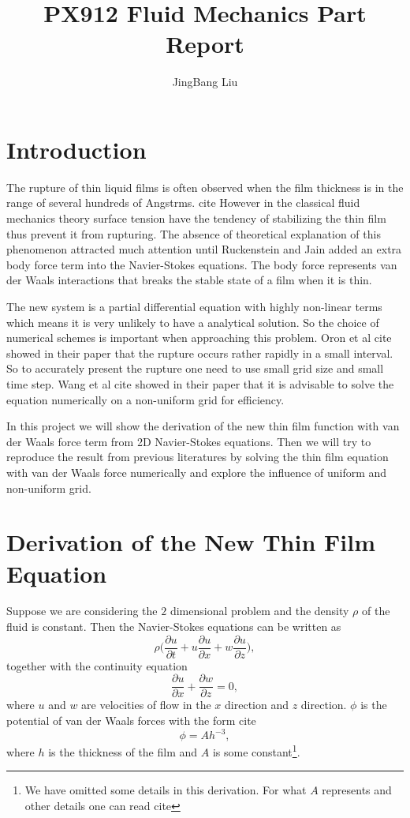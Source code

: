 \documentclass[]{article}
\title{PX912 Fluid Mechanics Part Report}
\author{JingBang Liu}
\begin{document}
\maketitle

\section{Introduction}

The rupture of thin liquid films is often observed when the film thickness is in the range of several hundreds of Angstrms. cite{} However in the classical fluid mechanics theory surface tension have the tendency of stabilizing the thin film thus prevent it from rupturing. The absence of theoretical explanation of this phenomenon attracted much attention until Ruckenstein and Jain added an extra body force term into the Navier-Stokes equations. The body force represents van der Waals interactions that breaks the stable state of a film when it is thin.

The new system is a partial differential equation with highly non-linear terms which means it is very unlikely to have a analytical solution. So the choice of numerical schemes is important when approaching this problem. Oron et al cite{} showed in their paper that the rupture occurs rather rapidly in a small interval. So to accurately present the rupture one need to use small grid size and small time step. Wang et al cite{} showed in their paper that it is advisable to solve the equation numerically on a non-uniform grid for efficiency.

In this project we will show the derivation of the new thin film function with van der Waals force term from 2D Navier-Stokes equations. Then we will try to reproduce the result from previous literatures by solving the thin film equation with van der Waals force numerically and explore the influence of uniform and non-uniform grid. 

\section{Derivation of the New Thin Film Equation}

Suppose we are considering the $2$ dimensional problem and the density $\rho$ of the fluid is constant. Then the Navier-Stokes equations can be written as
\begin{equation}
	\rho \big( \frac{\partial u}{\partial t}+ u\frac{\partial u}{\partial x} +w\frac{\partial u}{\partial z} \big),
\end{equation}
together with the continuity equation
\begin{equation}
	\frac{\partial u}{\partial x} + \frac{\partial w}{\partial z} = 0,
\end{equation}
where $u$ and $w$ are velocities of flow in the $x$ direction and $z$ direction. $\phi$ is the potential of van der Waals forces with the form cite{}
\begin{equation}
	\phi = Ah^{-3},
\end{equation}
where $h$ is the thickness of the film and $A$ is some constant\footnote{We have omitted some details in this derivation. For what $A$ represents and other details one can read cite{}}.
\end{document}
